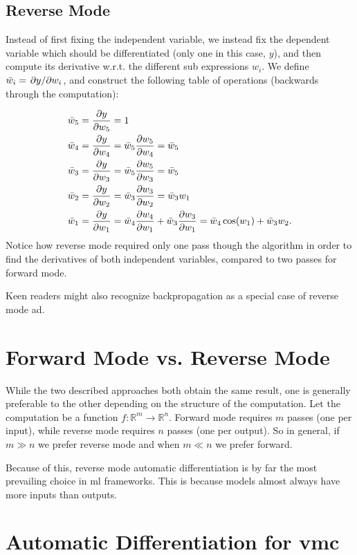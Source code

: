 \documentclass[Thesis.tex]{subfiles}
\begin{document}
\subsection{Reverse Mode}

Instead of first fixing the independent variable, we instead fix the dependent
variable which should be differentiated (only one in this case, \(y\)), and then
compute its derivative w.r.t. the different sub expressions $w_i$. We define
\(\bar w_i = \pdv*{y}{w_i}\), and construct the following table of operations
(backwards through the computation):

\begin{align*}
  \bar w_5 &= \pdv{y}{w_5} = 1\\
  \bar w_4 &= \pdv{y}{w_4} = \bar w_5\pdv{w_5}{w_4} = \bar w_5\\
  \bar w_3 &= \pdv{y}{w_3} = \bar w_5\pdv{w_5}{w_3} = \bar w_5\\
  \bar w_2 &= \pdv{y}{w_2} = \bar w_3\pdv{w_3}{w_2} = \bar w_3 w_1\\
  \bar w_1 &= \pdv{y}{w_1} = \bar w_4\pdv{w_4}{w_1} + \bar w_3 \pdv{w_3}{w_1}= \bar w_4 \cos(w_1) + \bar w_3w_2.
\end{align*}
Notice how reverse mode required only one pass though the algorithm in order to
find the derivatives of both independent variables, compared to two passes for
forward mode.

Keen readers might also recognize backpropagation as a special case of reverse mode \gls{ad}.

\section{Forward Mode vs. Reverse Mode}

While the two described approaches both obtain the same result, one is generally
preferable to the other depending on the structure of the computation. Let the
computation be a function $f: \mathbb{R}^{m}\to\mathbb{R}^n$. Forward mode
requires $m$ passes (one per input), while reverse mode requires $n$ passes (one
per output). So in general, if $m \gg n$ we prefer reverse mode and when $m\ll
n$ we prefer forward.

Because of this, reverse mode automatic differentiation is by far the most
prevailing choice in \gls{ml} frameworks. This is because models almost always have
more inputs than outputs.

\section{Automatic Differentiation for \gls{vmc}}
\end{document}
